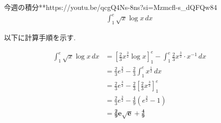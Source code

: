\documentclass[main]{subfiles}
\begin{document}

\begin{mondai}{8}{今週の積分}{**}{https://youtu.be/qcgQ4Ns-8ns?si=Mzmcfl-s_dQFQw84}
    \begin{align*}
        \int_1^e \sqrt{x}\log x \, dx
    \end{align*}
\end{mondai}


\solutionhead
\hfill
以下に計算手順を示す.
\hfill\

\begin{align*}
    \int_1^e \sqrt{x}\log x \, dx
        &= \left[\frac{2}{3}x^\frac{3}{2}\log x\right]_1^e-\int_1^e \frac{2}{3}x^\frac{3}{2}\cdot x^{-1} \, dx \\
        &= \frac{2}{3}e^\frac{3}{2}-\frac{2}{3}\int_1^ex^\frac{1}{2} \, dx \\
        &= \frac{2}{3}e^\frac{3}{2}-\frac{2}{3}\left[\frac{2}{3}x^\frac{3}{2}\right]_1^e \\
        &= \frac{2}{3}e^\frac{3}{2}-\frac{4}{9}\left(e^\frac{3}{2}-1\right) \\
        &= \boldsymbol{\frac{2}{9}e\sqrt{e}+\frac{4}{9}}
\end{align*}
\end{document}

